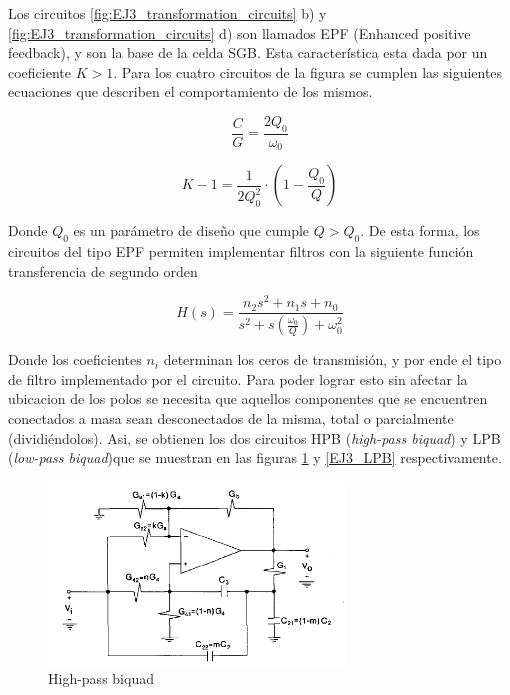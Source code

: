 Los circuitos \ref{fig:EJ3_transformation_circuits} b) y \ref{fig:EJ3_transformation_circuits} d) son llamados EPF (Enhanced positive feedback), y son la base de la celda SGB. Esta caracter\'istica esta dada por un coeficiente $K>1$. Para los cuatro circuitos de la figura se cumplen las siguientes ecuaciones que describen el comportamiento de los mismos.

\begin{equation}\label{EJ3eq1}
\frac{C}{G} = \frac{2Q_0}{\omega_0}
\end{equation}

\begin{equation}\label{EJ3eq2}
K-1 = \frac{1}{2Q_0^2}\cdot \left( 1-\frac{Q_0}{Q} \right)
\end{equation}

Donde $Q_0$ es un par\'ametro de dise\~no que cumple $Q>Q_0$. De esta forma, los circuitos del tipo EPF permiten implementar filtros con la siguiente funci\'on transferencia de segundo orden

\begin{equation}
H(s)=\frac{n_2s^2+n_1s+n_0}{s^2+s\left(\frac{\omega_0}{Q}\right)+\omega_0^2}
\end{equation}

Donde los coeficientes $n_i$ determinan los ceros de transmisi\'on, y por ende el tipo de filtro implementado por el circuito. Para poder lograr esto sin afectar la ubicacion de los polos se necesita que aquellos componentes que se encuentren conectados a masa sean desconectados de la misma, total o parcialmente (dividi\'endolos). Asi, se obtienen los dos circuitos HPB (\textit{high-pass biquad}) y LPB (\textit{low-pass biquad})que se muestran en las figuras \ref{EJ3_HPB} y \ref{EJ3_LPB} respectivamente.

\begin{figure}[H]
    \centering
    \includegraphics[width=0.7\textwidth]{../EJ3/Resources/HPB.png}
    \caption{High-pass biquad}
     \label{EJ3_HPB}
\end{figure}

